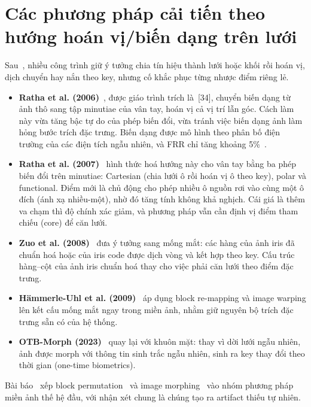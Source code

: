\documentclass[12pt,a4paper]{article}
\begin{document}
\section{Các phương pháp cải tiến theo hướng hoán vị/biến dạng trên lưới}
Sau~\cite{ratha2001}, nhiều công trình giữ ý tưởng chia tín hiệu thành lưới hoặc khối rồi hoán vị, dịch chuyển hay nắn theo key, nhưng cố khắc phục từng nhược điểm riêng lẻ.
\begin{itemize}
  \item \textbf{Ratha et al. (2006)}~\cite{ratha2006}, được giáo trình trích là~[34], chuyển biến dạng từ ảnh thô sang tập minutiae của vân tay, hoán vị cả vị trí lẫn góc. Cách làm này vừa tăng bậc tự do của phép biến đổi, vừa tránh việc biến dạng ảnh làm hỏng bước trích đặc trưng. Biến dạng được mô hình theo phân bố điện trường của các điện tích ngẫu nhiên, và FRR chỉ tăng khoảng 5\%~\cite[tr.~395]{adler2008}.
  \item \textbf{Ratha et al. (2007)}~\cite{ratha2007} hình thức hoá hướng này cho vân tay bằng ba phép biến đổi trên minutiae: Cartesian (chia lưới ô rồi hoán vị ô theo key), polar và functional. Điểm mới là chủ động cho phép nhiều ô nguồn rơi vào cùng một ô đích (ánh xạ nhiều-một), nhờ đó tăng tính không khả nghịch. Cái giá là thêm va chạm thì độ chính xác giảm, và phương pháp vẫn cần định vị điểm tham chiếu (core) để căn lưới.
  \item \textbf{Zuo et al. (2008)}~\cite{zuo2008} đưa ý tưởng sang mống mắt: các hàng của ảnh iris đã chuẩn hoá hoặc của iris code được dịch vòng và kết hợp theo key. Cấu trúc hàng–cột của ảnh iris chuẩn hoá thay cho việc phải căn lưới theo điểm đặc trưng.
  \item \textbf{Hämmerle-Uhl et al. (2009)}~\cite{hammerle2009} áp dụng block re-mapping và image warping lên kết cấu mống mắt ngay trong miền ảnh, nhằm giữ nguyên bộ trích đặc trưng sẵn có của hệ thống.
  \item \textbf{OTB-Morph (2023)}~\cite{ghafourian2023} quay lại với khuôn mặt: thay vì dời lưới ngẫu nhiên, ảnh được morph với thông tin sinh trắc ngẫu nhiên, sinh ra key thay đổi theo thời gian (one-time biometrics).
\end{itemize}
Bài báo~\cite{alam2025} xếp block permutation~\cite{ratha2001} và image morphing~\cite{ghafourian2023} vào nhóm phương pháp miền ảnh thế hệ đầu, với nhận xét chung là chúng tạo ra artifact thiếu tự nhiên.
\end{document}
